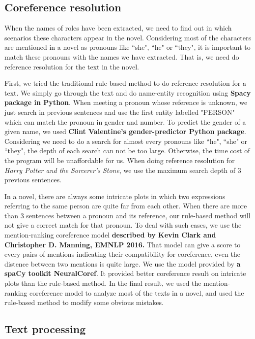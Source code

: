 \documentclass[11pt]{article}
\begin{document}
\subsection{Coreference resolution} %
\label{sect:pdf}

When the names of roles have been extracted, we need to find out in which scenarios these characters appear in the novel. Considering most of the characters are mentioned in a novel as pronouns like ``she", ``he" or ``they", it is important to match these pronouns with the names we have extracted. That is, we need do reference resolution for the text in the novel.

First, we tried the traditional rule-based method to do reference resolution for a text. We simply go through the text and do name-entity recognition using \textbf{Spacy package in Python}. When meeting a pronoun whose reference is unknown, we just search in previous sentences and use the first entity labelled "PERSON" which can match the pronoun in gender and number. To predict the gender of a given name, we used \textbf{Clint Valentine's gender-predictor Python package}. Considering we need to do a search for almost every pronouns like ``he", ``she" or ``they", the depth of each search can not be too large. Otherwise, the time cost of the program will be unaffordable for us. When doing reference resolution for \textit{Harry Potter and the Sorcerer's Stone}, we use the maximum search depth of 3 previous sentences.

In a novel, there are always some intricate plots in which two expressions referring to the same person are quite far from each other. When there are more than 3 sentences between a pronoun and its reference, our rule-based method will not give a correct match for that pronoun. To deal with such cases, we use the mention-ranking coreference model\textbf{ described by Kevin Clark and Christopher D. Manning, EMNLP 2016.} That model can give a score to every pairs of mentions indicating their compatibility for coreference, even the distence between two mentions is quite large. We use the model provided by \textbf{a spaCy toolkit NeuralCoref}. It provided better coreference result on intricate plots than the rule-based method. In the final result, we used the mention-ranking coreference model to analyze most of the texts in a novel, and used the rule-based method to modify some obvious mistakes.


\subsection{Text processing} %
\label{ssec:layout}
\end{document}
